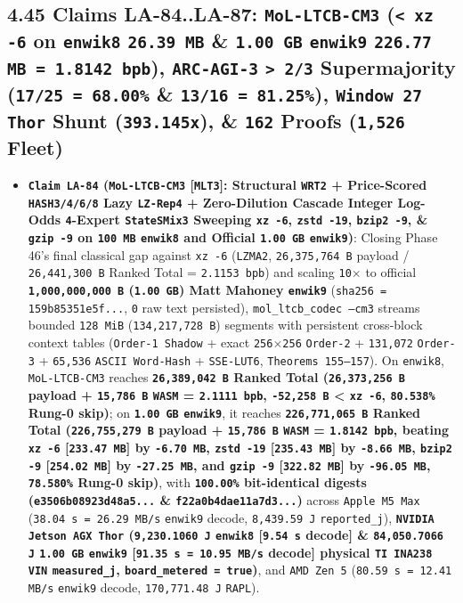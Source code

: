 \documentclass[10pt]{article}
\begin{document}
\subsection{4.45 Claims LA-84..LA-87: \texttt{MoL-LTCB-CM3} (\texttt{< xz -6} on \texttt{enwik8} \texttt{26.39 MB} \& \texttt{1.00 GB} \texttt{enwik9} \texttt{226.77 MB = 1.8142 bpb}), \texttt{ARC-AGI-3} \texttt{> 2/3} Supermajority (\texttt{17/25 = 68.00\%} \& \texttt{13/16 = 81.25\%}), \texttt{Window 27} \texttt{Thor} Shunt (\texttt{393.145x}), \& \texttt{162} Proofs (\texttt{1,526} Fleet)}\label{claim-la84}

\begin{itemize}
  \item \textbf{\texttt{Claim LA-84} (\texttt{MoL-LTCB-CM3} [\texttt{MLT3}]: Structural \texttt{WRT2} + Price-Scored \texttt{HASH3/4/6/8} Lazy \texttt{LZ-Rep4} + Zero-Dilution Cascade Integer Log-Odds \texttt{4}-Expert \texttt{StateSMix3} Sweeping \texttt{xz -6}, \texttt{zstd -19}, \texttt{bzip2 -9}, \& \texttt{gzip -9} on \texttt{100 MB} \texttt{enwik8} and Official \texttt{1.00 GB} \texttt{enwik9})}: Closing Phase 46's final classical gap against \texttt{xz -6} (\texttt{LZMA2}, \texttt{26,375,764 B} payload / \texttt{26,441,300 B} Ranked Total = \texttt{2.1153 bpb}) and scaling \texttt{10$\times$} to official \textbf{\texttt{1,000,000,000 B} (\texttt{1.00 GB}) Matt Mahoney \texttt{enwik9}} (\texttt{sha256 = 159b85351e5f...}, \texttt{0} raw text persisted), \texttt{mol\_ltcb\_codec --cm3} streams bounded \texttt{128 MiB} (\texttt{134,217,728 B}) segments with persistent cross-block context tables (\texttt{Order-1 Shadow} + exact \texttt{256$\times$256} \texttt{Order-2} + \texttt{131,072} \texttt{Order-3} + \texttt{65,536} \texttt{ASCII Word-Hash} + \texttt{SSE-LUT6}, \texttt{Theorems 155--157}). On \texttt{enwik8}, \texttt{MoL-LTCB-CM3} reaches \textbf{\texttt{26,389,042 B} Ranked Total (\texttt{26,373,256 B} payload + \texttt{15,786 B} \texttt{WASM} = \texttt{2.1111 bpb}, \texttt{-52,258 B} < \texttt{xz -6}, \texttt{80.538\%} Rung-0 skip)}; on \textbf{\texttt{1.00 GB} \texttt{enwik9}}, it reaches \textbf{\texttt{226,771,065 B} Ranked Total (\texttt{226,755,279 B} payload + \texttt{15,786 B} \texttt{WASM} = \texttt{1.8142 bpb}, beating \texttt{xz -6} [\texttt{233.47 MB}] by \texttt{-6.70 MB}, \texttt{zstd -19} [\texttt{235.43 MB}] by \texttt{-8.66 MB}, \texttt{bzip2 -9} [\texttt{254.02 MB}] by \texttt{-27.25 MB}, and \texttt{gzip -9} [\texttt{322.82 MB}] by \texttt{-96.05 MB}, \texttt{78.580\%} Rung-0 skip)}, with \textbf{\texttt{100.00\%} bit-identical digests (\texttt{e3506b08923d48a5...} \& \texttt{f22a0b4dae11a7d3...})} across \texttt{Apple M5 Max} (\texttt{38.04 s = 26.29 MB/s} \texttt{enwik9} decode, \texttt{8,439.59 J} \texttt{reported\_j}), \textbf{\texttt{NVIDIA Jetson AGX Thor} (\texttt{9,230.1060 J} \texttt{enwik8} [\texttt{9.54 s} decode] \& \texttt{84,050.7066 J} \texttt{1.00 GB} \texttt{enwik9} [\texttt{91.35 s = 10.95 MB/s} decode] physical \texttt{TI INA238 VIN} \texttt{measured\_j}, \texttt{board\_metered = true})}, and \texttt{AMD Zen 5} (\texttt{80.59 s = 12.41 MB/s} \texttt{enwik9} decode, \texttt{170,771.48 J} \texttt{RAPL}).

\end{itemize}
\end{document}
